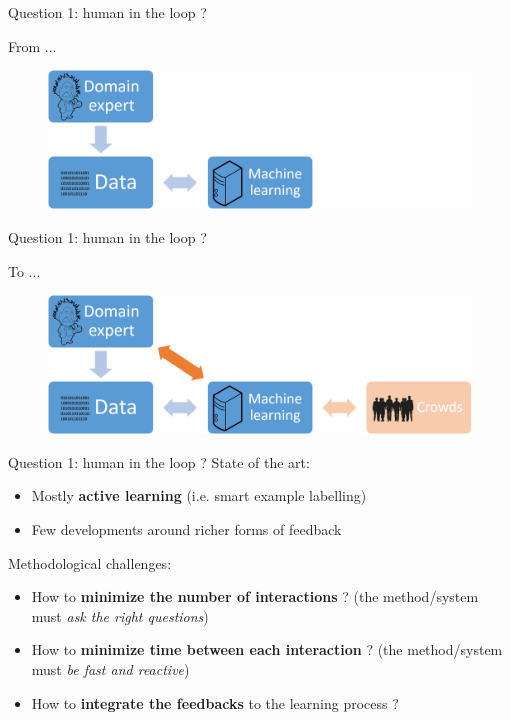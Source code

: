\documentclass{beamer}
\begin{document}
  
\begin{frame}{Question 1: human in the loop ?}
	
	From ... 
	
	\begin{figure}[h]
		\includegraphics[scale=0.30]{images/ml_typical.png}
	\end{figure}
	

\end{frame}

\begin{frame}{Question 1: human in the loop ?}
	
	To ... 
	
	\begin{figure}
		\includegraphics[scale=0.30]{images/ml_expert_crowds.png}
	\end{figure}	
	
\end{frame}

\begin{frame}{Question 1: human in the loop ?}
	State of the art:
	\begin{itemize}
		\item Mostly \textbf{active learning} (i.e. smart example labelling)
		\item Few developments around richer forms of feedback
	\end{itemize}		
	\vfill
	Methodological challenges:
	\begin{itemize}
		\item How to \textbf{minimize the number of interactions} ? {\small(the method/system must \textit{ask the right questions})}
		\item How to \textbf{minimize time between each interaction} ? {\small(the method/system must \textit{be fast and reactive})}
		\item How to \textbf{integrate the feedbacks} to the learning process ?
	\end{itemize}

\end{frame}
\end{document}
